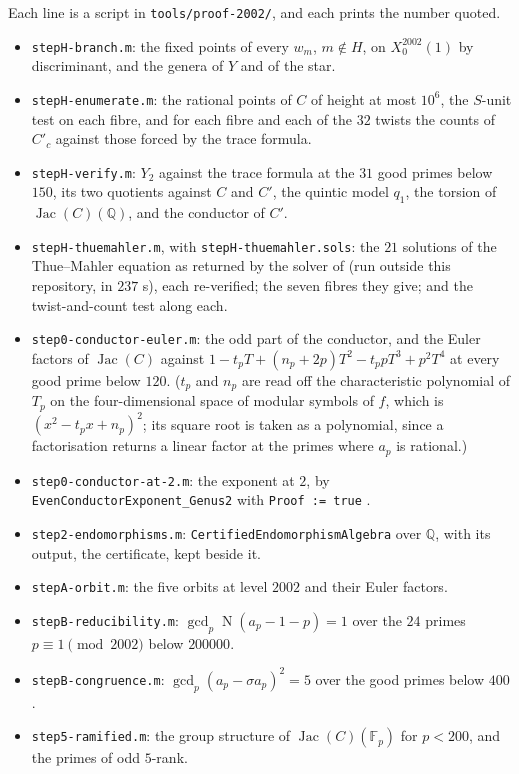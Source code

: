 \documentclass[11pt,reqno]{amsart}
\theoremstyle{plain}
\theoremstyle{definition}
\DeclareMathOperator{\Jac}{Jac}
\DeclareMathOperator{\Norm}{N}
\newcommand{\Q}{\mathbb{Q}}
\newcommand{\F}{\mathbb{F}}
\begin{document}
Each line is a script in \texttt{tools/proof-2002/}, and each prints the number quoted.
\begin{itemize}
\item \texttt{stepH-branch.m}: the fixed points of every $w_m$, $m\notin H$, on $X_0^{2002}(1)$ by
  discriminant, and the genera of $Y$ and of the star.
\item \texttt{stepH-enumerate.m}: the rational points of $C$ of height at most $10^6$, the
  $S$-unit test on each fibre, and for each fibre and each of the $32$ twists the counts of
  $C'_c$ against those forced by the trace formula.
\item \texttt{stepH-verify.m}: $Y_2$ against the trace formula at the $31$ good primes below $150$,
  its two quotients against $C$ and $C'$, the quintic model $q_1$, the torsion of $\Jac(C)(\Q)$, and
  the conductor of $C'$.
\item \texttt{stepH-thuemahler.m}, with \texttt{stepH-thuemahler.sols}: the $21$ solutions of the
  Thue--Mahler equation as returned by the solver of \cite{gs} (run outside this repository, in
  $237$ s), each re-verified; the seven fibres they give; and the twist-and-count test along each.
\item \texttt{step0-conductor-euler.m}: the odd part of the conductor, and the Euler factors of
  $\Jac(C)$ against $1-t_pT+(n_p+2p)T^2-t_ppT^3+p^2T^4$ at every good prime below $120$. ($t_p$
  and $n_p$ are read off the characteristic polynomial of $T_p$ on the four-dimensional space of
  modular symbols of $f$, which is $(x^2-t_px+n_p)^2$; its square root is taken as a polynomial,
  since a factorisation returns a linear factor at the primes where $a_p$ is rational.)
\item \texttt{step0-conductor-at-2.m}: the exponent at $2$, by \texttt{EvenConductorExponent\_Genus2}
  with \texttt{Proof := true} \cite{dd}.
\item \texttt{step2-endomorphisms.m}: \texttt{CertifiedEndomorphismAlgebra} \cite{cmsv} over $\Q$,
  with its output, the certificate, kept beside it.
\item \texttt{stepA-orbit.m}: the five orbits at level $2002$ and their Euler factors.
\item \texttt{stepB-reducibility.m}: $\gcd_p \Norm(a_p-1-p)=1$ over the $24$ primes $p\equiv1
  \pmod{2002}$ below $200000$.
\item \texttt{stepB-congruence.m}: $\gcd_p (a_p-\sigma a_p)^2=5$ over the good primes below $400$.
\item \texttt{step5-ramified.m}: the group structure of $\Jac(C)(\F_p)$ for $p<200$, and the primes
  of odd $5$-rank.
\end{itemize}
\end{document}
